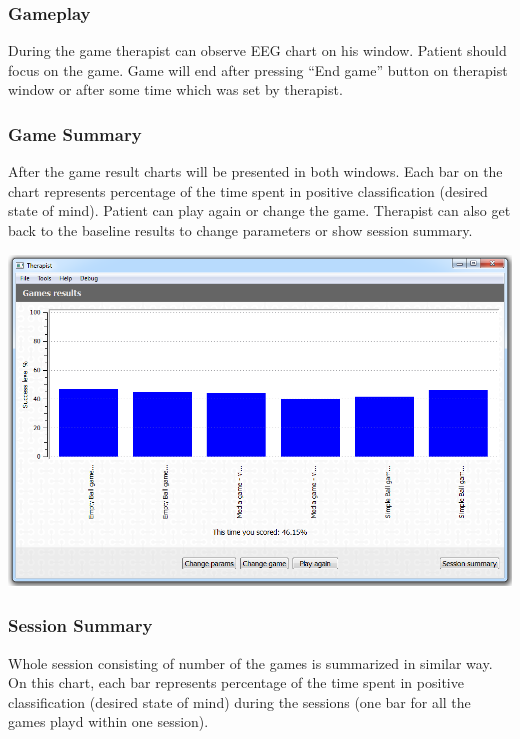 \documentclass[letterpaper,10pt,english]{sphinxmanual}
\begin{document}
\subsubsection{Gameplay}
\label{index:gameplay}
During the game therapist can observe EEG chart on his window. Patient should focus on the game. Game will end after pressing ``End game'' button on therapist window or after some time which was set by therapist.


\subsubsection{Game Summary}
\label{index:game-summary}
After the game result charts will be presented in both windows. Each bar on the chart represents percentage of the time spent in positive classification (desired state of mind). Patient can play again or change the game. Therapist can also get back to the baseline results to change parameters or show session summary.

{\hfill\includegraphics{PerformanceStatistics.PNG}\hfill}


\subsubsection{Session Summary}
\label{index:session-summary}
Whole session consisting of number of the games is summarized in similar way. On this chart, each bar represents percentage of the time spent in positive classification (desired state of mind) during the sessions (one bar for all the games playd within one session).
\end{document}
